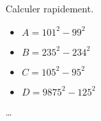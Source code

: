 \begin{exercice*}
    Calculer rapidement.
    \begin{multicols}{2}
        \begin{itemize}
            \item[] $A=101^2-99^2$
            \item[] $B=235^2-234^2$
            \item[] $C=105^2-95^2$
            \item[] $D=\num{9875}^2-125^2$
        \end{itemize}
    \end{multicols}
\end{exercice*}
\begin{corrige}
    \dots
\end{corrige}

